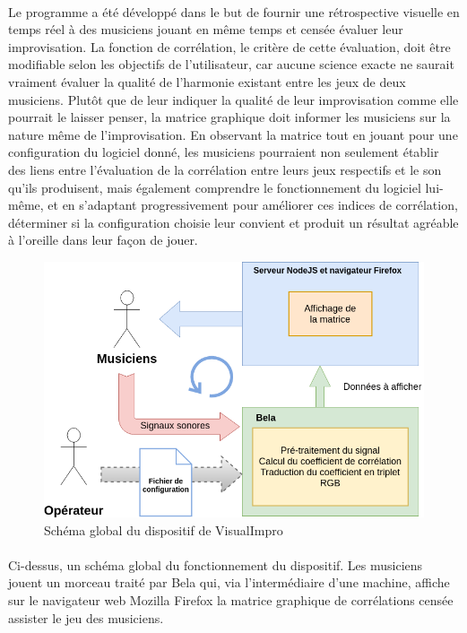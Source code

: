 \paragraph{}
Le programme a été développé dans le but de fournir une rétrospective
visuelle en temps réel à des musiciens jouant en même temps et censée
évaluer leur improvisation. La fonction de corrélation, le critère de
cette évaluation, doit être modifiable selon les objectifs de
l'utilisateur, car aucune science exacte ne saurait vraiment évaluer
la qualité de l'harmonie existant entre les jeux de deux
musiciens. Plutôt que de leur indiquer la qualité de leur
improvisation comme elle pourrait le laisser penser, la matrice
graphique doit informer les musiciens sur la nature même de
l'improvisation. En observant la matrice tout en jouant pour une
configuration du logiciel donné, les musiciens pourraient non
seulement établir des liens entre l'évaluation de la corrélation entre
leurs jeux respectifs et le son qu'ils produisent, mais également
comprendre le fonctionnement du logiciel lui-même, et en s'adaptant
progressivement pour améliorer ces indices de corrélation, déterminer
si la configuration choisie leur convient et produit un résultat
agréable à l'oreille dans leur façon de jouer.

\begin{figure}[H]
 \centering
 \includegraphics[scale=0.5]{assets/VisualImpro.png}
 \caption{Schéma global du dispositif de VisualImpro}
 \label{schéma global}
\end{figure}

\paragraph{}
Ci-dessus, un schéma global du fonctionnement du dispositif. Les
musiciens jouent un morceau traité par Bela qui, via l'intermédiaire
d'une machine, affiche sur le navigateur web Mozilla Firefox la
matrice graphique de corrélations censée assister le jeu des
musiciens.

